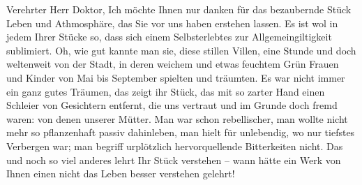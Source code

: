 \pstart{}Verehrter Herr Doktor,\pend\vspace{0.5em}
\pstart
           Ich möchte Ihnen nur danken für das bezaubernde Stück Leben und Athmosphäre, das Sie \label{K_L02567-1v}\label{K_L02567-1} vor uns haben erstehen lassen. Es ist wol in jedem Ihrer Stücke so, dass sich
               einem Selbsterlebtes zur Allgemeingiltigkeit sublimiert. Oh, wie gut kannte man sie,
               diese stillen Villen, eine Stunde und doch weltenweit von der Stadt, in deren weichem
               und etwas feuchtem Grün Frauen und Kinder von Mai bis September spielten und
               träumten. Es war nicht immer ein ganz gutes Träumen, das zeigt ihr Stück, das mit so zarter Hand einen
               Schleier von Gesichtern entfernt, die uns  vertraut
               und im Grunde doch fremd waren: von denen unserer Mütter. Man war schon rebellischer,
               man wollte nicht mehr so pflanzenhaft passiv dahinleben, man hielt für unlebendig, wo
               nur tiefstes Verbergen war; man begriff urplötzlich hervorquellende Bitterkeiten
               nicht. Das und noch so viel anderes lehrt Ihr Stück verstehen – wann hätte ein Werk von Ihnen einen nicht
               das Leben besser verstehen gelehrt!\pend
           
